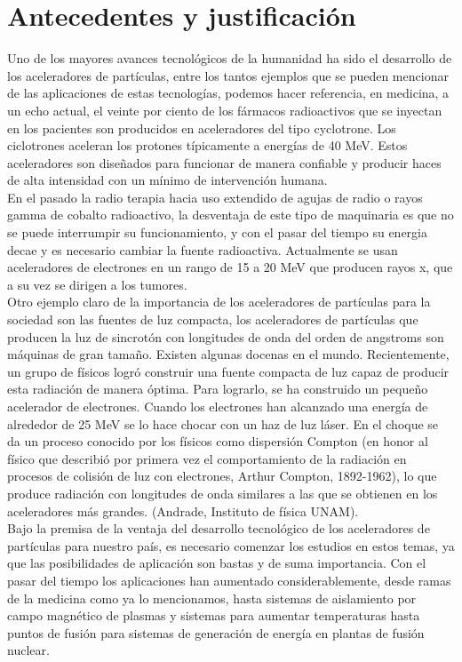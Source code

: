 \section{Antecedentes y justificación}


Uno de los mayores avances tecnológicos de la humanidad ha sido el desarrollo de los aceleradores de partículas, entre los tantos ejemplos que se pueden mencionar de las aplicaciones de estas tecnologías, podemos hacer referencia, en medicina, a un echo actual, el veinte por ciento de los fármacos radioactivos que se inyectan en los pacientes son producidos en aceleradores del tipo cyclotrone. Los ciclotrones aceleran los protones típicamente a energías de 40 MeV. Estos aceleradores son diseñados para funcionar de manera confiable y producir haces de alta intensidad con un mínimo de intervención humana.\\

En el pasado la radio terapia hacia uso extendido de agujas de radio o rayos gamma de cobalto radioactivo, la desventaja de este tipo de maquinaria es que no se puede interrumpir su funcionamiento, y con el pasar del tiempo su energia decae y es necesario cambiar la fuente radioactiva. Actualmente se usan aceleradores de electrones en un rango de 15 a 20 MeV que producen rayos x, que a su vez se dirigen a los tumores.\\


Otro ejemplo claro de la importancia de los aceleradores de partículas para la sociedad son las fuentes de luz compacta, los aceleradores de partículas que producen la luz de sincrotón con longitudes de onda del orden de angstroms son máquinas de gran tamaño. Existen algunas docenas en el mundo. Recientemente, un grupo de físicos logró construir una fuente compacta de luz capaz de producir esta radiación de manera óptima. Para lograrlo, se ha construido un pequeño acelerador de electrones. Cuando los electrones han alcanzado una energía de alrededor de 25 MeV se lo hace chocar con un haz de luz láser. En el choque se da un proceso conocido por los físicos como dispersión Compton (en honor al físico que describió por primera vez el comportamiento de la radiación en procesos de colisión de luz con electrones, Arthur Compton, 1892-1962), lo que produce radiación con longitudes de onda similares a las que se obtienen en los aceleradores más grandes. (Andrade, Instituto de física UNAM).\\


Bajo la premisa de la ventaja del desarrollo tecnológico de los aceleradores de partículas para nuestro país, es necesario comenzar los estudios en estos temas, ya que las posibilidades de aplicación son bastas y de suma importancia. Con el pasar del tiempo los aplicaciones han aumentado considerablemente, desde ramas de la medicina como ya lo mencionamos, hasta sistemas de aislamiento por campo magnético de plasmas y sistemas para aumentar temperaturas hasta puntos de fusión para sistemas de generación de energía en plantas de fusión nuclear.\\


